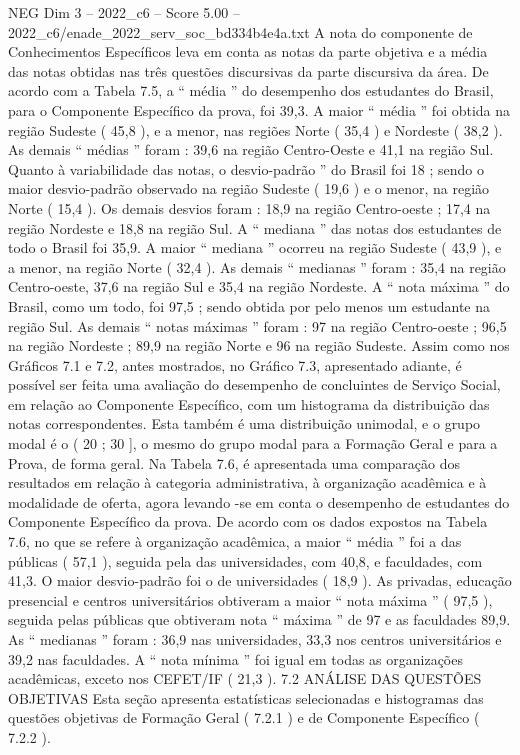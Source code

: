 \begin{textsample}{NEG Dim 3 – 2022\_c6 – Score 5.00 – 2022\_c6/enade\_2022\_serv\_soc\_bd334b4e4a.txt}
A nota do componente de Conhecimentos Específicos leva em conta as notas da parte objetiva e a média das notas obtidas nas três questões discursivas da parte discursiva da área.
De acordo com a Tabela 7.5, a “ média ” do desempenho dos estudantes do Brasil, para o Componente Específico da prova, foi 39,3.
A maior “ média ” foi obtida na região Sudeste ( 45,8 ), e a menor, nas regiões Norte ( 35,4 ) e Nordeste ( 38,2 ).
As demais “ médias ” foram : 39,6 na região Centro-Oeste e 41,1 na região Sul.
Quanto à variabilidade das notas, o desvio-padrão ” do Brasil foi 18 ; sendo o maior desvio-padrão observado na região Sudeste ( 19,6 ) e o menor, na região Norte ( 15,4 ).
Os demais desvios foram : 18,9 na região Centro-oeste ; 17,4 na região Nordeste e 18,8 na região Sul.
A “ mediana ” das notas dos estudantes de todo o Brasil foi 35,9.
A maior “ mediana ” ocorreu na região Sudeste ( 43,9 ), e a menor, na região Norte ( 32,4 ).
As demais “ medianas ” foram : 35,4 na região Centro-oeste, 37,6 na região Sul e 35,4 na região Nordeste.
A “ nota máxima ” do Brasil, como um todo, foi 97,5 ; sendo obtida por pelo menos um estudante na região Sul.
As demais “ notas máximas ” foram : 97 na região Centro-oeste ; 96,5 na região Nordeste ; 89,9 na região Norte e 96 na região Sudeste.
Assim como nos Gráficos 7.1 e 7.2, antes mostrados, no Gráfico 7.3, apresentado adiante, é possível ser feita uma avaliação do desempenho de concluintes de Serviço Social, em relação ao Componente Específico, com um histograma da distribuição das notas correspondentes.
Esta também é uma distribuição unimodal, e o grupo modal é o ( 20 ; 30 ], o mesmo do grupo modal para a Formação Geral e para a Prova, de forma geral.
Na Tabela 7.6, é apresentada uma comparação dos resultados em relação à categoria administrativa, à organização acadêmica e à modalidade de oferta, agora levando -se em conta o desempenho de estudantes do Componente Específico da prova.
De acordo com os dados expostos na Tabela 7.6, no que se refere à organização acadêmica, a maior “ média ” foi a das públicas ( 57,1 ), seguida pela das universidades, com 40,8, e faculdades, com 41,3.
O maior desvio-padrão foi o de universidades ( 18,9 ).
As privadas, educação presencial e centros universitários obtiveram a maior “ nota máxima ” ( 97,5 ), seguida pelas públicas que obtiveram nota “ máxima ” de 97 e as faculdades 89,9.
As “ medianas ” foram : 36,9 nas universidades, 33,3 nos centros universitários e 39,2 nas faculdades.
A “ nota mínima ” foi igual em todas as organizações acadêmicas, exceto nos CEFET/IF ( 21,3 ). 7.2 ANÁLISE DAS QUESTÕES OBJETIVAS Esta seção apresenta estatísticas selecionadas e histogramas das questões objetivas de Formação Geral ( 7.2.1 ) e de Componente Específico ( 7.2.2 ).

\end{textsample}
